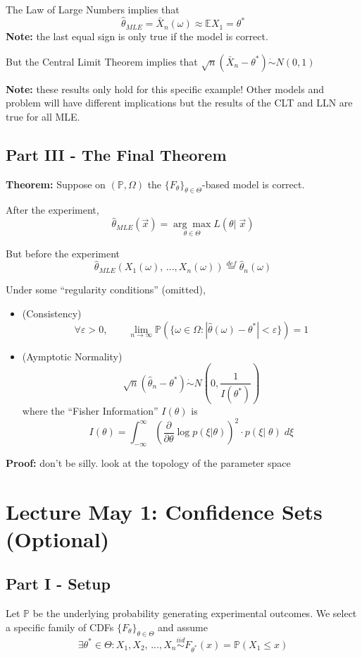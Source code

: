 \documentclass[12pt]{article}
\renewcommand{\P}{\mathbb{P}}
\newcommand{\E}{\mathbb{E}}
\begin{document}
The Law of Large Numbers implies that 
\[\hat \theta_{MLE} = \bar{X}_n(\omega) \approx \E X_1 = \theta^*\]
\textbf{Note:} the last equal sign is only true if the model is correct. 

But the Central Limit Theorem implies that $\sqrt{n} (\bar{X}_n - \theta^*) \dot \sim N(0, 1)$

\textbf{Note:} these results only hold for this specific example! Other models and problem will have different implications but the results of the CLT and LLN are true for all MLE. 

\subsection*{Part III - The Final Theorem}
\textbf{Theorem:} 
Suppose on $(\P, \Omega)$ the $\{F_\theta\}_{\theta \in \Theta}$-based model is correct. 

After the experiment, 
\[\hat \theta_{MLE}(\vec{x}) = \underset{\theta \in \Theta}{\arg \max} L(\theta |\; \vec{x}) \]

But before the experiment 
\[\hat \theta_{MLE}(X_1(\omega), \,..., X_n(\omega)) \overset{def}{=} \hat \theta_n(\omega)\]

Under some ``regularity conditions'' (omitted), 
\begin{itemize}
    \item (Consistency)  
    \[\forall \varepsilon > 0, \qquad \lim_{n\to \infty}\P(\{\omega \in \Omega: |\hat \theta(\omega) - \theta^*| < \varepsilon\}) = 1\]

    \item (Aymptotic Normality)
    \[\sqrt{n}(\hat \theta_n - \theta^*) \dot \sim N(0, \frac{1}{I(\theta^*)})\]
    where the ``Fisher Information'' $I(\theta)$ is 
    \[I(\theta) = \int_{-\infty}^{\infty} \left(\frac{\partial}{\partial \theta}\log p(\xi | \theta)\right)^2 \cdot p(\xi |\; \theta)\; d\xi\]
\end{itemize}

\textbf{Proof:} don't be silly. look at the topology of the parameter space

\section*{Lecture May 1: Confidence Sets (Optional)}
\subsection*{Part I - Setup} 
Let $\P$ be the underlying probability generating experimental outcomes. We select a specific family of CDFs $\{F_{\theta}\}_{\theta \in \Theta}$ and assume 
\[\exists \theta^* \in \Theta: X_1, X_2,\, ..., X_n \overset{iid}{\sim} F_{\theta^*}(x) = \P(X_1 \leq x)\] 
\end{document}
